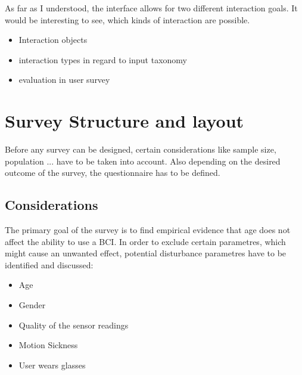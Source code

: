             As far as I understood, the interface allows for two different interaction goals. It would be interesting to see, which kinds of interaction are possible.                

            \begin{itemize}
                \item Interaction objects
                \item interaction types in regard to input taxonomy
                \item evaluation in user survey
            \end{itemize}

    \chapter{Survey Structure and layout}

        Before any survey can be designed, certain considerations like sample size, population ... 
        have to be taken into account. Also depending on the desired outcome of the survey, the questionnaire has to be defined.

        \section{Considerations}\label{considerations}

            The primary goal of the survey is to find empirical evidence that age does not affect the ability to use a BCI. In order to exclude certain parametres, which might cause an unwanted effect, potential disturbance parametres have to be identified and discussed:

            \begin{itemize}
                \item Age
                \item Gender
                \item Quality of the sensor readings
                \item Motion Sickness
                \item User wears glasses
            \end{itemize}

